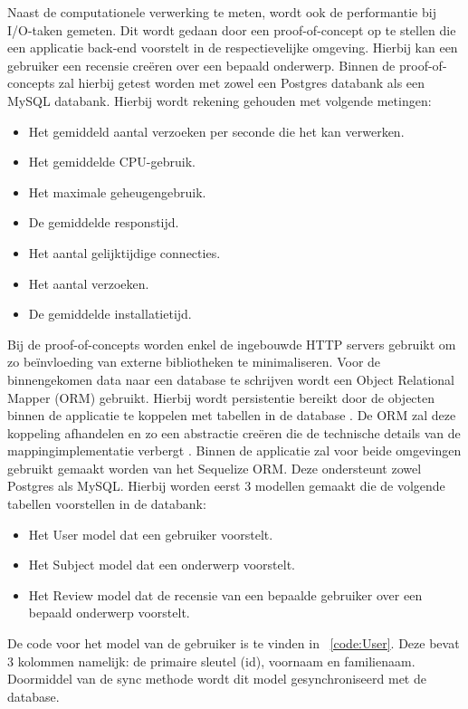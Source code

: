 Naast de computationele verwerking te meten, wordt ook de performantie bij I/O-taken gemeten.
Dit wordt gedaan door een proof-of-concept op te stellen die een applicatie back-end voorstelt in de respectievelijke omgeving.
Hierbij kan een gebruiker een recensie creëren over een bepaald onderwerp. 
Binnen de proof-of-concepts zal hierbij getest worden met zowel een Postgres databank als een MySQL databank.
Hierbij wordt rekening gehouden met volgende metingen:
\begin{itemize}
    \item Het gemiddeld aantal verzoeken per seconde die het kan verwerken.
    \item Het gemiddelde CPU-gebruik.
    \item Het maximale geheugengebruik.
    \item De gemiddelde responstijd.
    \item Het aantal gelijktijdige connecties.
    \item Het aantal verzoeken.
    \item De gemiddelde installatietijd.
\end{itemize}
Bij de proof-of-concepts worden enkel de ingebouwde HTTP servers gebruikt om zo beïnvloeding van externe bibliotheken te minimaliseren.
Voor de binnengekomen data naar een database te schrijven wordt een Object Relational Mapper (ORM) gebruikt. 
Hierbij wordt persistentie bereikt door de objecten binnen de applicatie te koppelen met tabellen in de database \autocite{Lorenz2017}.
De ORM zal deze koppeling afhandelen en zo een abstractie creëren die de technische details van de mappingimplementatie verbergt \autocite{Lorenz2017}.
Binnen de applicatie zal voor beide omgevingen gebruikt gemaakt worden van het Sequelize ORM. Deze ondersteunt zowel Postgres als MySQL.
Hierbij worden eerst 3 modellen gemaakt die de volgende tabellen voorstellen in de databank:
\begin{itemize}
  \item Het User model dat een gebruiker voorstelt.
  \item Het Subject model dat een onderwerp voorstelt.
  \item Het Review model dat de recensie van een bepaalde gebruiker over een bepaald onderwerp voorstelt.
\end{itemize}
De code voor het model van de gebruiker is te vinden in ~\ref{code:User}. Deze bevat 3 kolommen namelijk: de primaire sleutel (id), voornaam en familienaam.
Doormiddel van de sync methode wordt dit model gesynchroniseerd met de database. 
